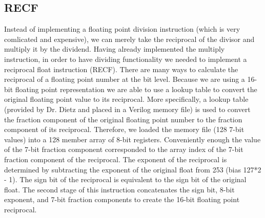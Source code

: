 \documentclass[conference]{IEEEtran}
\begin{document}
    \subsection{RECF}
    Instead of implementing a floating point division instruction (which is very comlicated and expensive), we can merely take the reciprocal of the divisor and multiply it by the dividend. Having already implemented the multiply instruction, in order to have dividing functionality we needed to implement a reciprocal float instruction (RECF). There are many ways to calculate the reciprocal of a floating point number at the bit level. Because we are using a 16-bit floating point representation we are able to use a lookup table to convert the original floating point value to its reciprocal. More specifically, a lookup table (provided by Dr. Dietz and placed in a Verilog memory file) is used to convert the fraction component of the original floating point number to the fraction component of its reciprocal. Therefore, we loaded the memory file (128 7-bit values) into a 128 member array of 8-bit registers. Conveniently enough the value of the 7-bit fraction component corresponded to the array index of the 7-bit fraction component of the reciprocal. The exponent of the reciprocal is determined by subtracting the exponent of the original float from 253 (bias 127*2 - 1). The sign bit of the reciprocal is equivalent to the sign bit of the original float. The second stage of this instruction concatenates the sign bit, 8-bit exponent, and 7-bit fraction components to create the 16-bit floating point reciprocal.
\end{document}
